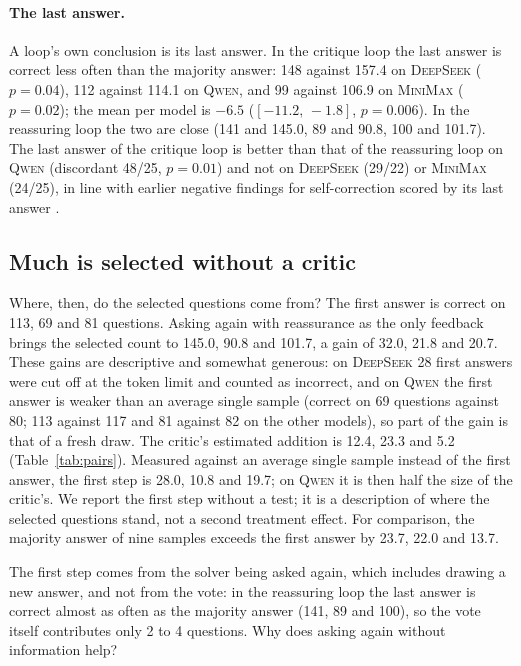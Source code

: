 \documentclass[11pt]{article}
\newcommand{\ds}{\textsc{DeepSeek}}
\newcommand{\qw}{\textsc{Qwen}}
\newcommand{\mm}{\textsc{MiniMax}}
\newcommand{\ci}[2]{$[#1,\,#2]$}
\begin{document}
\paragraph{The last answer.}
A loop's own conclusion is its last answer.
In the critique loop the last answer is correct less often than the majority answer: 148 against 157.4 on \ds{} ($p=0.04$), 112 against 114.1 on \qw, and 99 against 106.9 on \mm{} ($p=0.02$); the mean per model is $-6.5$ (\ci{-11.2}{-1.8}, $p=0.006$).
In the reassuring loop the two are close (141 and 145.0, 89 and 90.8, 100 and 101.7).
The last answer of the critique loop is better than that of the reassuring loop on \qw{} (discordant 48/25, $p=0.01$) and not on \ds{} (29/22) or \mm{} (24/25), in line with earlier negative findings for self-correction scored by its last answer \citep{huang2024cannot}.

\subsection{Much is selected without a critic}
\label{sec:mech}

Where, then, do the selected questions come from?
The first answer is correct on 113, 69 and 81 questions.
Asking again with reassurance as the only feedback brings the selected count to 145.0, 90.8 and 101.7, a gain of 32.0, 21.8 and 20.7.
These gains are descriptive and somewhat generous: on \ds{} 28 first answers were cut off at the token limit and counted as incorrect, and on \qw{} the first answer is weaker than an average single sample (correct on 69 questions against 80; 113 against 117 and 81 against 82 on the other models), so part of the gain is that of a fresh draw.
The critic's estimated addition is 12.4, 23.3 and 5.2 (Table~\ref{tab:pairs}).
Measured against an average single sample instead of the first answer, the first step is 28.0, 10.8 and 19.7; on \qw{} it is then half the size of the critic's.
We report the first step without a test; it is a description of where the selected questions stand, not a second treatment effect.
For comparison, the majority answer of nine samples exceeds the first answer by 23.7, 22.0 and 13.7.

The first step comes from the solver being asked again, which includes drawing a new answer, and not from the vote: in the reassuring loop the last answer is correct almost as often as the majority answer (141, 89 and 100), so the vote itself contributes only 2 to 4 questions.
Why does asking again without information help?
\end{document}
